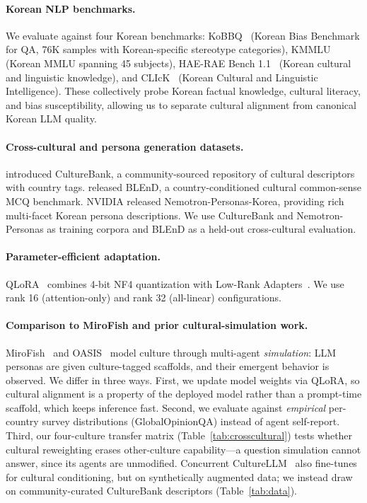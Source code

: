\documentclass{article}
\begin{document}
\paragraph{Korean NLP benchmarks.}
We evaluate against four Korean benchmarks: KoBBQ~\cite{jin2024kobbq} (Korean Bias Benchmark for QA, 76K samples with Korean-specific stereotype categories), KMMLU~\cite{son2024kmmlu} (Korean MMLU spanning 45 subjects), HAE-RAE Bench 1.1~\cite{son2023haerae} (Korean cultural and linguistic knowledge), and CLIcK~\cite{kim2024click} (Korean Cultural and Linguistic Intelligence). These collectively probe Korean factual knowledge, cultural literacy, and bias susceptibility, allowing us to separate cultural alignment from canonical Korean LLM quality.

\paragraph{Cross-cultural and persona generation datasets.}
\citet{shi2024culturebank} introduced CultureBank, a community-sourced repository of cultural descriptors with country tags. \citet{myung2024blend} released BLEnD, a country-conditioned cultural common-sense MCQ benchmark. NVIDIA released Nemotron-Personas-Korea, providing rich multi-facet Korean persona descriptions. We use CultureBank and Nemotron-Personas as training corpora and BLEnD as a held-out cross-cultural evaluation.

\paragraph{Parameter-efficient adaptation.}
QLoRA~\cite{dettmers2023qlora} combines 4-bit NF4 quantization with Low-Rank Adapters~\cite{hu2021lora}. We use rank 16 (attention-only) and rank 32 (all-linear) configurations.

\paragraph{Comparison to MiroFish and prior cultural-simulation work.}
MiroFish~\cite{ji2026mirofish} and OASIS~\cite{yang2024oasis} model culture through multi-agent \emph{simulation}: LLM personas are given culture-tagged scaffolds, and their emergent behavior is observed. We differ in three ways. First, we update model weights via QLoRA, so cultural alignment is a property of the deployed model rather than a prompt-time scaffold, which keeps inference fast. Second, we evaluate against \emph{empirical} per-country survey distributions (GlobalOpinionQA) instead of agent self-report. Third, our four-culture transfer matrix (Table~\ref{tab:crosscultural}) tests whether cultural reweighting erases other-culture capability---a question simulation cannot answer, since its agents are unmodified. Concurrent CultureLLM~\cite{li2024culturellm} also fine-tunes for cultural conditioning, but on synthetically augmented data; we instead draw on community-curated CultureBank descriptors (Table~\ref{tab:data}).
\end{document}

